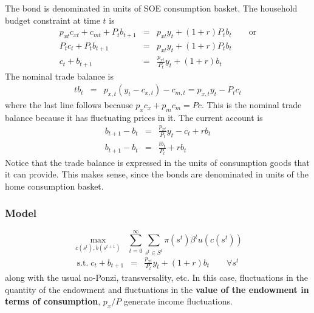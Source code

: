 \documentclass[11pt,pdftex,twoside,letterpaper]{exam}
\begin{document}
The bond is denominated in units of SOE consumption basket. The household budget constraint at time $t$ is
\begin{eqnarray}
  p_{xt} c_{xt} + c_{mt} +P_tb_{t+1} &=& p_{xt}y_t+(1+r)P_tb_t \qquad \textrm{or}\\
  P_tc_{t} +P_tb_{t+1} &=& p_{xt}y_t+(1+r)P_tb_t\\
  c_{t} +b_{t+1} &=& \frac{p_{xt}}{P_t}y_t+(1+r)b_t
\end{eqnarray}
The nominal trade balance is
\begin{eqnarray}
  tb_t &=& p_{x,t}(y_t-c_{x,t})-c_{m,t} = p_{x,t}y_t-P_tc_t
\end{eqnarray}
where the last line follows because $p_xc_x + p_mc_m=Pc$. This is the nominal trade balance because it has fluctuating prices in it. The current account is
\begin{eqnarray}
  b_{t+1} -b_t &=& \frac{p_{xt}}{P_t}y_t- c_t+rb_t \\
  b_{t+1} -b_t &=& \frac{tb_t}{P_t}+rb_t
\end{eqnarray}
Notice that the trade balance is expressed in the units of consumption goods that it can provide. This makes sense, since the bonds are denominated in units of the home consumption basket.

\subsubsection{Model}
\begin{equation}
 \max_{c(s^t),b(s^{t+1})} \;\; \sum_{t=0}^\infty \sum_{s^t\in S^t} \pi(s^t) \beta^tu(c(s^t))
\end{equation}
\begin{eqnarray}
  \textrm{s.t.} \; c_{t} +b_{t+1} &=& \frac{p_{xt}}{P_t}y_t+(1+r)b_t \qquad \forall s^t
\end{eqnarray}
along with the usual no-Ponzi, transversality, etc.
In this case, fluctuations in the quantity of the endowment and fluctuations in the \textbf{value of the endowment in terms of consumption}, $p_x/P$ generate income fluctuations.
\end{document}
